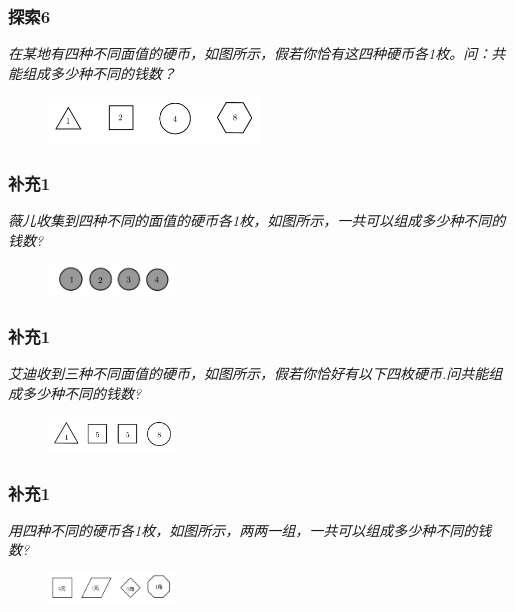 \begin{frame}
    \frametitle{探索6}
    \vspace*{-2cm}
    \textit{在某地有四种不同面值的硬币，如图所示，假若你恰有这四种硬币各1枚。问：共能组成多少种不同的钱数？}
    \begin{figure}[H] 
        \centering
        \includegraphics[width=0.5\textwidth]{./pics/Chapter_2/tansuo6.png}
    \end{figure}
\end{frame}

\begin{frame}
    \frametitle{补充1}
    \textit{薇儿收集到四种不同的面值的硬币各1枚，如图所示，一共可以组成多少种不同的钱数?}
    \begin{figure}[H] 
        \centering
        \includegraphics[width=0.3\textwidth]{./pics/Chapter_2/buchong1_1.png}
    \end{figure}
\end{frame}

\begin{frame}
    \frametitle{补充1}
    \textit{艾迪收到三种不同面值的硬币，如图所示，假若你恰好有以下四枚硬币.问共能组成多少种不同的钱数?}
    \begin{figure}[H] 
        \centering
        \includegraphics[width=0.3\textwidth]{./pics/Chapter_2/buchong1_2.png}
    \end{figure}
\end{frame}

\begin{frame}
    \frametitle{补充1}
    \textit{用四种不同的硬币各1枚，如图所示，两两一组，一共可以组成多少种不同的钱数?}
    \begin{figure}[H] 
        \centering
        \includegraphics[width=0.3\textwidth]{./pics/Chapter_2/buchong1_3.png}
    \end{figure}
\end{frame}

